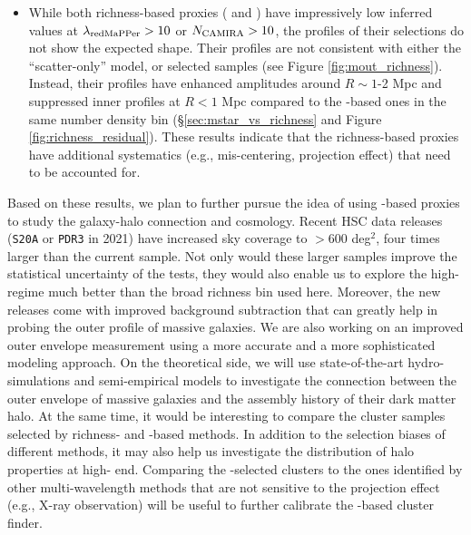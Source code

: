 \documentclass[fleqn,usenatbib,useAMS,english]{mnras}
\begin{document}
\begin{itemize}
        \item While both richness-based \mvir{} proxies (\redm{} and \camira{}) have
            impressively low inferred \sigmvir{} values at $\lambda_{\rm redMaPPer} > 10$ or
            $N_{\rm CAMIRA} > 10$, the \dsigma{} profiles of their selections do not show the
            expected shape.
            Their profiles are not consistent with either the ``scatter-only'' model, or \mstar{}
            selected samples (see Figure \ref{fig:mout_richness}).
            Instead, their \dsigma{} profiles have enhanced amplitudes around $R\sim
            1$-2 Mpc and suppressed inner profiles at $R < 1$ Mpc compared to the \mstar{}-based
            ones in the same number density bin (\S \ref{sec:mstar_vs_richness} and Figure
            \ref{fig:richness_residual}).
            These results indicate that the richness-based \mvir{} proxies have additional
            systematics (e.g., mis-centering, projection effect) that need to be accounted for.
            
    \end{itemize}

    Based on these results, we plan to further pursue the idea of using \mstar{}-based
    \mvir{} proxies to study the galaxy-halo connection and cosmology.
    Recent HSC data releases (\texttt{S20A} or \texttt{PDR3} in 2021) have increased sky
    coverage to $> 600$ deg$^2$, four times larger than the current sample.
    Not only would these larger samples improve the statistical uncertainty of the \topn{} tests,
    they would also enable us to explore the high-\mvir{} regime much better than the
    broad richness bin used here.
    Moreover, the new releases come with improved background subtraction that can greatly help in
    probing the outer profile of massive galaxies.
    We are also working on an improved outer envelope \mstar{} measurement using a more accurate
    \mlratio{} and a more sophisticated modeling approach.
    On the theoretical side, we will use state-of-the-art hydro-simulations and
    semi-empirical models to investigate the connection between the outer envelope of massive
    galaxies and the assembly history of their dark matter halo.
    At the same time, it would be interesting to compare the cluster samples selected by 
    richness- and \mstar{}-based methods.
    In addition to the selection biases of different methods, it may also help us investigate the
    distribution of halo properties at high-\mvir{} end.
    Comparing the \mstar{}-selected clusters to the ones identified by other multi-wavelength
    methods that are not sensitive to the projection effect (e.g., X-ray observation) will be
    useful to further calibrate the \mstar{}-based cluster finder.
\end{document}
